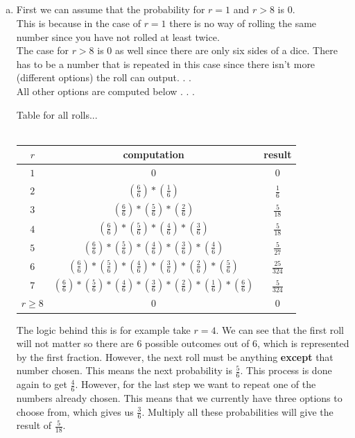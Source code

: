 \documentclass[10pt]{report}
\begin{document}
 \subsection{}
 \begin{enumerate}[(a)]
 \item First we can assume that the probability for $r = 1 $ and $r > 8 $ is $0 $.\ \\
 This is because in the case of $r = 1 $ there is no way of rolling the same number since you have not rolled at least twice.  \ \\
 The case for $r >8 $ is $0 $ as well since there are only six sides of a dice. There has to be a number that is repeated in this case since there isn't more (different options) the roll can output. . . \ \\
 All other options are computed below . . . 
  \begin{center}
 Table for all rolls... \\
 \ \\
 \begin{tabular}{ |c|c|c| }
 \hline
$r$ & computation & result \\
\hline
$1$ & $0 $ & $0$ \\
\hline
$2$ & $ (\frac{6}{6}) * (\frac{1}{6}) $ & $\frac{1}{6} $ \\
\hline
$3$ & $ (\frac{6}{6}) * (\frac{5}{6}) * (\frac{2}{6})$ & $\frac{5}{18} $ \\
\hline
$4$ & $ (\frac{6}{6}) * (\frac{5}{6}) * (\frac{4}{6}) * (\frac{3}{6})$ & $\frac{5}{18} $ \\
\hline
$5$ & $ (\frac{6}{6}) * (\frac{5}{6}) * (\frac{4}{6}) * (\frac{3}{6}) * (\frac{4}{6})$ & $\frac{5}{27} $ \\
\hline
$6$ & $ (\frac{6}{6}) * (\frac{5}{6}) * (\frac{4}{6}) * (\frac{3}{6}) * (\frac{2}{6}) * (\frac{5}{6})$ & $\frac{25}{324} $ \\
\hline
$7$ & $ (\frac{6}{6}) * (\frac{5}{6}) * (\frac{4}{6}) * (\frac{3}{6}) * (\frac{2}{6}) * (\frac{1}{6}) * (\frac{6}{6})$ & $\frac{5}{324} $ \\
\hline
$r \geq 8$ & $0 $ & $0 $ \\
\hline
 \end{tabular}
 \end{center}
 The logic behind this is for example take $r = 4 $. We can see that the first roll will not matter so there are $6 $ possible outcomes out of $6 $, which is represented by the first fraction. However, the next roll must be anything \textbf{except} that number chosen. This means the next probability is $\frac{5}{6} $. This process is done again to get $\frac{4}{6} $. However, for the last step we want to repeat one of the numbers already chosen. This means that we currently have three options to choose from, which gives us $\frac{3}{6} $. Multiply all these probabilities will give the result of $\frac{5}{18} $. 

\end{enumerate}
\end{document}
